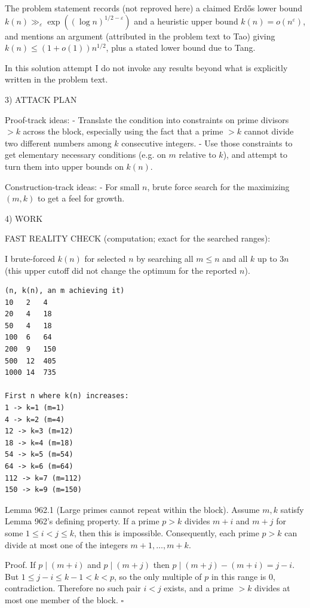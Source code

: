 The problem statement records (not reproved here) a claimed Erd\H{o}s lower bound $k(n)\gg_\varepsilon \exp((\log n)^{1/2-\varepsilon})$ and a heuristic upper bound $k(n)=o(n^\varepsilon)$, and mentions an argument (attributed in the problem text to Tao) giving $k(n)\le (1+o(1))n^{1/2}$, plus a stated lower bound due to Tang.

In this solution attempt I do not invoke any results beyond what is explicitly written in the problem text.

3) ATTACK PLAN

Proof-track ideas:
- Translate the condition into constraints on prime divisors $>k$ across the block, especially using the fact that a prime $>k$ cannot divide two different numbers among $k$ consecutive integers.
- Use those constraints to get elementary necessary conditions (e.g. on $m$ relative to $k$), and attempt to turn them into upper bounds on $k(n)$.

Construction-track ideas:
- For small $n$, brute force search for the maximizing $(m,k)$ to get a feel for growth.

4) WORK

FAST REALITY CHECK (computation; exact for the searched ranges):

I brute-forced $k(n)$ for selected $n$ by searching all $m\le n$ and all $k$ up to $3n$ (this upper cutoff did not change the optimum for the reported $n$).

\begin{verbatim}
(n, k(n), an m achieving it)
10   2   4
20   4   18
50   4   18
100  6   64
200  9   150
500  12  405
1000 14  735

First n where k(n) increases:
1 -> k=1 (m=1)
4 -> k=2 (m=4)
12 -> k=3 (m=12)
18 -> k=4 (m=18)
54 -> k=5 (m=54)
64 -> k=6 (m=64)
112 -> k=7 (m=112)
150 -> k=9 (m=150)
\end{verbatim}

Lemma 962.1 (Large primes cannot repeat within the block).
Assume $m,k$ satisfy Lemma 962's defining property. If a prime $p>k$ divides $m+i$ and $m+j$ for some $1\le i<j\le k$, then this is impossible. Consequently, each prime $p>k$ can divide at most one of the integers $m+1,\dots,m+k$.

Proof.
If $p\mid (m+i)$ and $p\mid (m+j)$ then $p\mid (m+j)-(m+i)=j-i$. But $1\le j-i\le k-1<k<p$, so the only multiple of $p$ in this range is $0$, contradiction. Therefore no such pair $i<j$ exists, and a prime $>k$ divides at most one member of the block. $\square$

